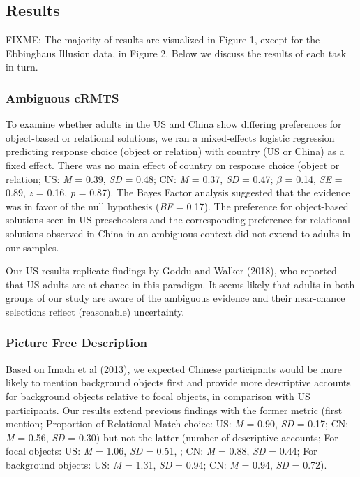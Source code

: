 \documentclass[
  man]{apa6}
\begin{document}
\hypertarget{results}{%
\subsection{Results}\label{results}}

FIXME: The majority of results are visualized in Figure 1, except for the Ebbinghaus Illusion data, in Figure 2. Below we discuss the results of each task in turn.

\hypertarget{ambiguous-crmts-1}{%
\subsubsection{Ambiguous cRMTS}\label{ambiguous-crmts-1}}

To examine whether adults in the US and China show differing preferences for object-based or relational solutions, we ran a mixed-effects logistic regression predicting response choice (object or relation) with country (US or China) as a fixed effect. There was no main effect of country on response choice (object or relation; US: \emph{M} = 0.39, \emph{SD} = 0.48; CN: \emph{M} = 0.37, \emph{SD} = 0.47; \(\beta\) = 0.14, \emph{SE} = 0.89, \emph{z} = 0.16, \emph{p} = 0.87). The Bayes Factor analysis suggested that the evidence was in favor of the null hypothesis (\emph{BF} = 0.17). The preference for object-based solutions seen in US preschoolers and the corresponding preference for relational solutions observed in China in an ambiguous context did not extend to adults in our samples.

Our US results replicate findings by Goddu and Walker (2018), who reported that US adults are at chance in this paradigm. It seems likely that adults in both groups of our study are aware of the ambiguous evidence and their near-chance selections reflect (reasonable) uncertainty.

\hypertarget{picture-free-description}{%
\subsubsection{Picture Free Description}\label{picture-free-description}}

Based on Imada et al (2013), we expected Chinese participants would be more likely to mention background objects first and provide more descriptive accounts for background objects relative to focal objects, in comparison with US participants. Our results extend previous findings with the former metric (first mention; Proportion of Relational Match choice: US: \emph{M} = 0.90, \emph{SD} = 0.17; CN: \emph{M} = 0.56, \emph{SD} = 0.30) but not the latter (number of descriptive accounts; For focal objects: US: \emph{M} = 1.06, \emph{SD} = 0.51, ; CN: \emph{M} = 0.88, \emph{SD} = 0.44; For background objects: US: \emph{M} = 1.31, \emph{SD} = 0.94; CN: \emph{M} = 0.94, \emph{SD} = 0.72).
\end{document}
